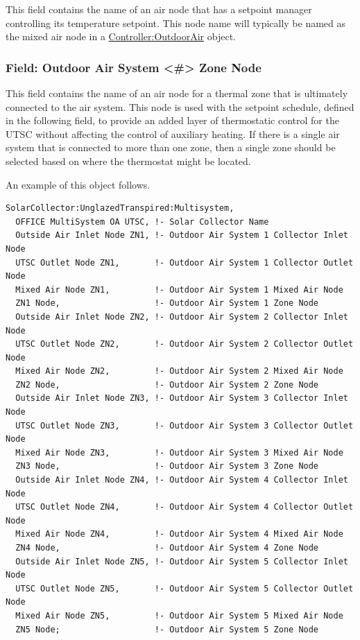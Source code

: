 This field contains the name of an air node that has a setpoint manager controlling its temperature setpoint. This node name will typically be named as the mixed air node in a \hyperref[controlleroutdoorair]{Controller:OutdoorAir} object.

\subsubsection{Field: Outdoor Air System \textless{}\#\textgreater{} Zone Node}\label{field-outdoor-air-system-zone-node}

This field contains the name of an air node for a thermal zone that is ultimately connected to the air system. This node is used with the setpoint schedule, defined in the following field, to provide an added layer of thermostatic control for the UTSC without affecting the control of auxiliary heating. If there is a single air system that is connected to more than one zone, then a single zone should be selected based on where the thermostat might be located.

An example of this object follows.

\begin{lstlisting}
SolarCollector:UnglazedTranspired:Multisystem,
  OFFICE MultiSystem OA UTSC, !- Solar Collector Name
  Outside Air Inlet Node ZN1, !- Outdoor Air System 1 Collector Inlet Node
  UTSC Outlet Node ZN1,       !- Outdoor Air System 1 Collector Outlet Node
  Mixed Air Node ZN1,         !- Outdoor Air System 1 Mixed Air Node
  ZN1 Node,                   !- Outdoor Air System 1 Zone Node
  Outside Air Inlet Node ZN2, !- Outdoor Air System 2 Collector Inlet Node
  UTSC Outlet Node ZN2,       !- Outdoor Air System 2 Collector Outlet Node
  Mixed Air Node ZN2,         !- Outdoor Air System 2 Mixed Air Node
  ZN2 Node,                   !- Outdoor Air System 2 Zone Node
  Outside Air Inlet Node ZN3, !- Outdoor Air System 3 Collector Inlet Node
  UTSC Outlet Node ZN3,       !- Outdoor Air System 3 Collector Outlet Node
  Mixed Air Node ZN3,         !- Outdoor Air System 3 Mixed Air Node
  ZN3 Node,                   !- Outdoor Air System 3 Zone Node
  Outside Air Inlet Node ZN4, !- Outdoor Air System 4 Collector Inlet Node
  UTSC Outlet Node ZN4,       !- Outdoor Air System 4 Collector Outlet Node
  Mixed Air Node ZN4,         !- Outdoor Air System 4 Mixed Air Node
  ZN4 Node,                   !- Outdoor Air System 4 Zone Node
  Outside Air Inlet Node ZN5, !- Outdoor Air System 5 Collector Inlet Node
  UTSC Outlet Node ZN5,       !- Outdoor Air System 5 Collector Outlet Node
  Mixed Air Node ZN5,         !- Outdoor Air System 5 Mixed Air Node
  ZN5 Node;                   !- Outdoor Air System 5 Zone Node
\end{lstlisting}
